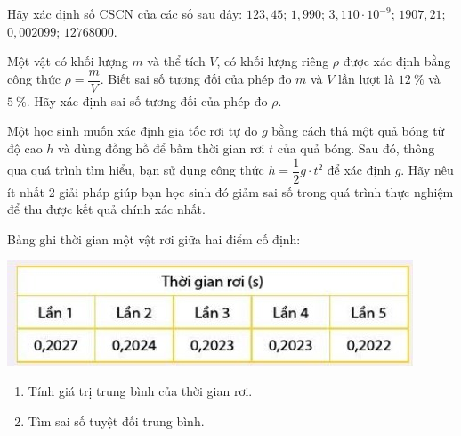 \begin{ex}
	Hãy xác định số CSCN của các số sau đây: $123,45$; $1,990$; $3,110\cdot 10^{-9}$; $1907,21$; $0,002099$; $12768000$. 
\end{ex}


\begin{ex}
	Một vật có khối lượng $m$ và thể tích $V$, có khối lượng riêng $\rho$ được xác định bằng công thức $\rho =\dfrac{m}{V}$. Biết sai số tương đối của phép đo $m$ và $V$ lần lượt là $\SI{12}{\percent}$ và $\SI{5}{\percent}$. Hãy xác định sai số tương đối của phép đo $\rho$.
\end{ex}

\begin{ex}
	Một học sinh muốn xác định gia tốc rơi tự do $g$ bằng cách thả một quả bóng từ độ cao $h$ và dùng đồng hồ để bấm thời gian rơi $t$ của quả bóng. Sau đó, thông qua quá trình tìm hiểu, bạn sử dụng công thức $h=\dfrac{1}{2}g\cdot t^2$ để xác định $g$. Hãy nêu ít nhất 2 giải pháp giúp bạn học sinh đó giảm sai số trong quá trình thực nghiệm để thu được kết quả chính xác nhất.
\end{ex}

\begin{ex}
	Bảng ghi thời gian một vật rơi giữa hai điểm cố định:
	\begin{center}
		\includegraphics[scale=1]{figs/G10Y25B2-5}
	\end{center}
	\begin{enumerate}[label=\alph*)]
		\item Tính giá trị trung bình của thời gian rơi.
		\item Tìm sai số tuyệt đối trung bình.
	\end{enumerate}
\end{ex}


